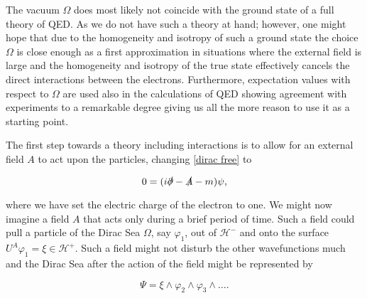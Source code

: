 \documentclass[b5paper,draft,openbib,12pt]{memoir}
\begin{document}
The vacuum \(\Omega\) does most likely not coincide with the 
ground state of a full theory of QED. As we do not have 
such a theory at hand; 
however, one might hope that due to the homogeneity and isotropy 
of such a ground state the choice \(\Omega\) is close enough as a
first approximation in situations where the external field is large 
and the homogeneity and isotropy of the true state 
effectively cancels the direct 
interactions between the electrons.  Furthermore, 
expectation values with respect to \(\Omega\) are 
used also in the
calculations of QED showing agreement with experiments to a remarkable 
degree giving us all the more reason to use it as a starting point. 

The first step towards a theory including interactions is to allow 
for an external field \(A\) to act upon the particles, changing 
\eqref{dirac free} to

\begin{equation}\label{dirac ext field}
  0= (i\slashed{\partial}-\slashed{A}-m ) \psi,
\end{equation}

where we have set the electric charge of the electron to one.
We might now imagine a field \(A\) that acts only during a 
brief period of time. Such a field could pull a particle 
of the Dirac Sea \(\Omega\), say 
\(\varphi_1\), out of \(\mathcal{H}^-\) and  
onto the surface \(U^A \varphi_1=\xi \in \mathcal{H}^+\).
Such a field might not disturb the other wavefunctions much 
and the Dirac Sea after the action of the field might be 
represented by 

\begin{equation}\label{toy example dirac sea}
  \Psi= \xi\wedge \varphi_2\wedge \varphi_3 \wedge \dots.
\end{equation}
\end{document}
